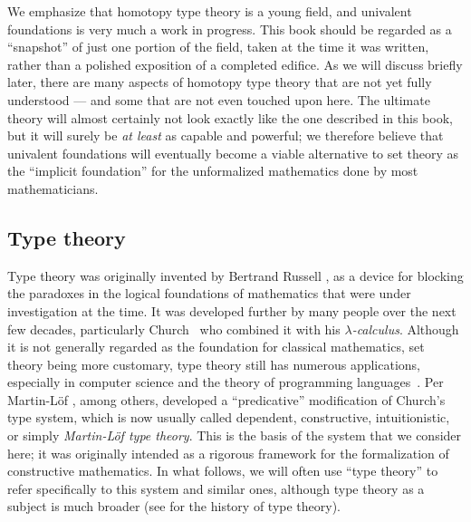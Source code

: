 \OPTwidow

We emphasize that homotopy type theory is a young field, and univalent foundations is very much a work in progress. 
This book should be regarded as a ``snapshot'' of just one portion of the field, taken at the time it was written, rather than a polished exposition of a completed edifice. 
As we will discuss briefly later, there are many aspects of homotopy type theory that are not yet fully understood --- and some that are not even touched upon here. 
The ultimate theory will almost certainly not look exactly like the one described in this book, but it will surely be \emph{at least} as capable and powerful; we therefore believe that univalent foundations will eventually become a viable alternative to set theory as the ``implicit foundation'' for the unformalized mathematics done by most mathematicians.

\subsection*{Type theory}

Type theory was originally invented by Bertrand Russell \cite{Russell:1908}, as a device for blocking the paradoxes in the logical foundations of mathematics  that were under investigation at the time.
It was developed further by many people over the next few decades, particularly Church~\cite{Church:1940tu,Church:1941tc} who combined it with his \textit{$\lambda$-calculus}.
Although it is not generally regarded as the foundation for classical mathematics, set theory being more customary, type theory still has numerous applications, especially in computer science and the theory of programming languages~\cite{Pierce-TAPL}.
%
%
%
Per Martin-L\"{o}f \cite{Martin-Lof-1972,Martin-Lof-1973,Martin-Lof-1979,martin-lof:bibliopolis}, among others,
developed a ``predicative'' modification of Church's type system, which is now usually called dependent, constructive, intuitionistic, or simply \emph{Martin\--L\"of type theory}. This is the basis of the system that we consider here; it was originally intended as a rigorous framework for the formalization of constructive mathematics.  In what follows, we will often use ``type theory'' to refer specifically to this system and similar ones, although type theory as a subject is much broader (see \cite{somma,kamar} for the history of type theory).

